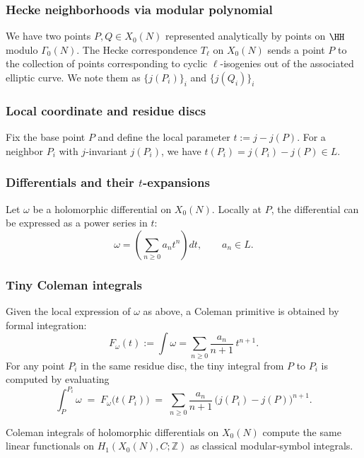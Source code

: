 \documentclass[10pt]{amsart}
\theoremstyle{theostyle}
\newcommand{\ZZ}{\mathbb{Z}}
\begin{document}
\subsubsection*{Hecke neighborhoods via modular polynomial}
We have two points $P,Q\in X_0(N)$ represented analytically by points on $\HH$ modulo $\Gamma_0(N)$.
The Hecke correspondence $T_\ell$ on $X_0(N)$ sends a point $P$ to the
collection of points corresponding to cyclic $\ell$-isogenies out of the associated elliptic curve. %
We note them as $\{j(P_i)\}_i$ and $\{j(Q_i)\}_i$

\subsubsection*{Local coordinate and residue discs}
Fix the base point $P$ and define the local parameter $t := j - j(P)$.
For a neighbor $P_i$ with $j$-invariant $j(P_i)$, we have $t(P_i)=j(P_i)-j(P)\in L.$
\subsubsection*{Differentials and their $t$-expansions}
Let $\omega$ be a holomorphic differential on $X_0(N)$.  Locally at $P$, the
differential can be expressed as a power series in $t$:
\[
\omega = \left(\sum_{n\ge 0} a_n t^n\right) dt,
\qquad a_n\in L.
\]

\subsubsection*{Tiny Coleman integrals}
Given the local expression of $\omega$ as above, a Coleman primitive is
obtained by formal integration:
\[
F_\omega(t) := \int \omega
= \sum_{n\ge 0} \frac{a_n}{n+1}\, t^{n+1}.
\]
For any point  $P_i$ in the same residue disc, the tiny integral
from $P$ to $P_i$ is computed by evaluating
\[
\int_P^{P_i}\omega \;=\; F_\omega\!\bigl(t(P_i)\bigr)
\;=\;
\sum_{n\ge 0} \frac{a_n}{n+1}\,
\bigl(j(P_i)-j(P)\bigr)^{n+1}.
\]

Coleman integrals of holomorphic
differentials on $X_0(N)$ compute the same linear functionals on
$H_1(X_0(N),C;\ZZ)$ as classical modular-symbol integrals.
\end{document}

